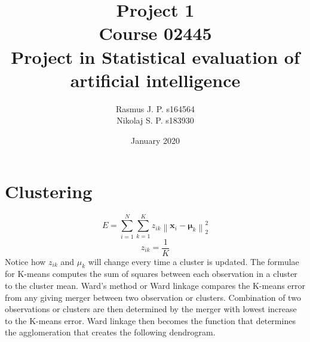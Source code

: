 \documentclass{article}
\begin{document}
\begin{titlepage}
	
	
	\title{Project 1 \\ Course 02445 \\ Project in Statistical evaluation of \\ artificial intelligence }
	\author{Rasmus J. P. s164564 \\ Nikolaj S. P. s183930}
	\date{January 2020}
	\maketitle
\end{titlepage}


\section{Clustering}


\begin{equation}
E=\sum_{i=1}^{N} \sum_{k=1}^{K} z_{i k}\left\|\boldsymbol{x}_{i}-\boldsymbol{\mu}_{k}\right\|_{2}^{2}
\end{equation}
\begin{equation}
z_{i k} = \frac{1}{K}
\end{equation}
Notice how $z_{ik}$ and $\mu_{k}$ will change every time a cluster is updated.
The formulae for K-means computes the sum of squares between each observation in a cluster to the cluster mean.
Ward's method or Ward linkage compares the K-means error from any giving merger between two observation or clusters. Combination of two observations or clusters are then determined by the merger with lowest increase to the K-means error.
Ward linkage then becomes the function that determines the agglomeration that creates the following dendrogram.




\end{document}
